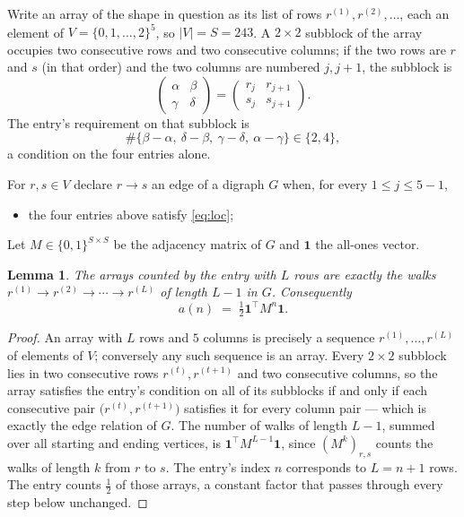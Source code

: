\documentclass[11pt,a4paper]{article}
\theoremstyle{plain}
\newtheorem{lemma}[theorem]{Lemma}
\theoremstyle{definition}
\begin{document}
Write an array of the shape in question as its list of rows
$r^{(1)},r^{(2)},\dots$, each an element of
$V=\{0,1,\dots,2\}^{5}$, so $|V|=S=243$. A $2\times2$ subblock of the array
occupies two consecutive rows and two consecutive columns; if the two rows are $r$
and $s$ (in that order) and the two columns are numbered $j,j+1$,
the subblock is
\[
\begin{pmatrix}\alpha&\beta\\\gamma&\delta\end{pmatrix}=\begin{pmatrix}r_j&r_{j+1}\\s_j&s_{j+1}\end{pmatrix}.
\]
The entry's requirement on that subblock is
\begin{equation}\label{eq:loc}
\#\{\beta-\alpha,\ \delta-\beta,\ \gamma-\delta,\ \alpha-\gamma\}\in\{2,4\},
\end{equation}
a condition on the four entries alone.

For $r,s\in V$ declare $r\to s$ an edge of a digraph $G$ when, for every
$1\le j\le 5-1$,
\begin{itemize}
\item the four entries above satisfy \eqref{eq:loc};

\end{itemize}
Let $M\in\{0,1\}^{S\times S}$ be the adjacency matrix of $G$ and $\mathbf{1}$ the
all-ones vector.

\begin{lemma}\label{lem:walk}
The arrays counted by the entry with $L$ rows are exactly the walks
$r^{(1)}\to r^{(2)}\to\cdots\to r^{(L)}$ of length $L-1$ in $G$. Consequently
\[
a(n)\;=\;\tfrac1{2}\mathbf{1}^{\!\top}M^{n}\mathbf{1} .
\]
\end{lemma}

\begin{proof}
An array with $L$ rows and $5$ columns is precisely a sequence
$r^{(1)},\dots,r^{(L)}$ of elements of $V$; conversely any such sequence is an array.
Every $2\times2$ subblock lies in two consecutive rows $r^{(t)},r^{(t+1)}$ and two
consecutive columns, so the array satisfies the entry's condition on all of its subblocks
if and only if each consecutive pair $\bigl(r^{(t)},r^{(t+1)}\bigr)$ satisfies it for
every column pair --- which is exactly the edge relation of $G$. The number of walks of
length $L-1$, summed over all starting and ending vertices, is
$\mathbf{1}^{\!\top}M^{L-1}\mathbf{1}$, since $(M^{k})_{r,s}$ counts the walks of
length $k$ from $r$ to $s$. The entry's index $n$ corresponds to $L=n+1$ rows. The entry counts $\tfrac1{2}$ of those arrays, a constant factor that passes through every step below unchanged.
\end{proof}
\end{document}
